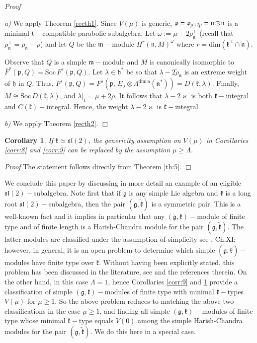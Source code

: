 \documentclass[10pt]{amsart}
\newtheorem{cor}[theo]{Corollary}
\renewenvironment{proof}{ \emph{Proof}}{$\Box$}
\newcommand{\Soc}{\mathrm{Soc}}
\renewcommand{\gg}{\mathfrak{g}}
\newcommand{\hh}{\mathfrak{h}}
\newcommand{\kk}{\mathfrak{k}}
\newcommand{\mm}{\mathfrak{m}}
\newcommand{\nn}{\mathfrak{n}}
\newcommand{\pp}{\mathfrak{p}}
\renewcommand{\tt}{\mathfrak{t}}
\renewcommand{\sl}{\mathfrak{sl}}
\def\crplus{\hbox{$\supset${\raise1.05pt\hbox{\kern -0.55em ${\scriptscriptstyle +}$}}\ }}
\begin{document}
\begin{proof}

 \textit{a)} We apply Theorem \ref{recth1}. Since $V(\mu)$ is generic, $\pp=\pp_{\mu+2\rho} = \mm \crplus \nn$ is a minimal $\tt-$compatible parabolic subalgebra. Let $\omega :=\mu - 2\rho_{\nn}^{\perp}$ (recall that $\rho_{\nn}^{\perp} = \rho_{\nn} - \rho $) and let $Q$ be the $\mm-$module $H^r(\nn,M)^{\omega}$ where $r=\mathrm{dim}(\kk^{\perp} \cap \nn)$.

Observe that $Q$ is a simple $\mm-$module and $M$ is canonically isomorphic to $\bar{F}^s(\pp,Q) = \Soc\,F^s(\pp,Q)$. Let $\lambda \in \hh^*$ be so that $\lambda - 2\tilde{\rho}_{\nn}$ is an extreme weight of $\hh$ in $Q$. Thus, $F^s(\pp,Q) = F^s(\pp,\,E_{\lambda} \otimes \Lambda ^{\mathrm{dim}\,\nn}(\nn^*)) = D(\kk,\lambda)$. Finally, $M \cong \Soc\,D(\kk,\lambda)$, and $\lambda|_{\tt} = \mu + 2\rho$. It follows that $\lambda - 2\varkappa$ is both $\kk-$integral and $C(\kk)-$integral. Hence, the weight $\lambda - 2\varkappa$ is $\tilde{\kk}-$integral.

\vspace{0.3cm}

 \textit{b)} We apply Theorem \ref{recth2}.
\end{proof}

\begin{cor}\label{corr:7}
    If $\kk\simeq \sl(2)$, the genericity assumption on $V(\mu)$ in Corollaries \ref{corr:8} and \ref{corr:9} can be replaced by the assumption $\mu\geq\Lambda$.
\end{cor}

\begin{proof}
The statement follows directly from Theorem \ref{th:5}.
\end{proof}

\vspace{0.3cm}

We conclude this paper by discussing in more detail an example of an eligible $\sl(2)-$subalgebra. Note first that if $\gg$ is any simple Lie algebra and $\kk$ is a long root $\sl(2)-$subalgebra, then the pair $(\gg,\tilde{\kk})$ is a symmetric pair. This is a well-known fact and it implies in particular that any $(\gg,\kk)-$module of finite type and of finite length is a Harish-Chandra module for the pair $(\gg,\tilde{\kk})$. The latter modules are classified under the assumption of simplicity see \cite{KV}, Ch.XI; however, in general, it is an open problem to determine which simple $(\gg,\tilde{\kk})-$modules have finite type over $\kk$. Without having been explicitly stated, this problem has been discussed in the literature, see \cite{OW} and the references therein. On the other hand, in this case $\Lambda = 1$, hence Corollaries \ref{corr:9} and \ref{corr:7} provide a classification of simple $(\gg,\kk)-$modules of finite type with minimal $\kk-$types $V(\mu)$ for $\mu \geq 1$. So the above problem 
reduces to matching the 
above two classifications in the case $\mu \geq 1$, and finding all simple $(\gg,\kk)-$modules of finite type whose minimal $\kk-$type equals $V(0)$ among the simple Harish-Chandra modules for the pair $(\gg,\tilde{\kk})$. We do this here in a special case.
\end{document}
